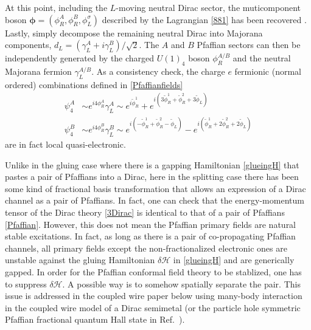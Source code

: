 At this point, including the $L$-moving neutral Dirac sector, the muticomponent boson $\boldsymbol\phi=(\phi^A_R,\phi^B_R,\phi^\sigma_L)$ described by the Lagrangian \eqref{881} has been recovered . Lastly, simply decompose the remaining neutral Dirac into Majorana components, $d_L=(\gamma^A_L+i\gamma^B_L)/\sqrt{2}$. The $A$ and $B$ Pfaffian sectors can then be independently generated by the charged $U(1)_4$ boson $\phi^{A/B}_R$ and the neutral Majorana fermion $\gamma^{A/B}_L$. As a consistency check, the charge $e$ fermionic (normal ordered) combinations defined in \eqref{Pfaffianfields} \begin{align}\psi_4^A&\sim e^{i4\phi^A_R}\gamma_L^A\sim e^{i\tilde\phi^1_R}+e^{i(3\tilde\phi^1_R+\tilde\phi^2_R+3\tilde\phi_L)}\label{psi4def1}\\\psi_4^B&\sim e^{i4\phi^B_R}\gamma_L^B\sim e^{i(-\tilde\phi^1_R+\tilde\phi^2_R-\tilde\phi_L)}-e^{i(\tilde\phi^1_R+2\tilde\phi^2_R+2\tilde\phi_L)}\nonumber\end{align} are in fact local quasi-electronic. %

Unlike in the gluing case where there is a gapping Hamiltonian \eqref{glueingH} that pastes a pair of Pfaffians into a Dirac, here in the splitting case there has been some kind of fractional basis transformation that allows an expression of a Dirac channel as a pair of Pfaffians. In fact, one can check that the energy-momentum tensor of the Dirac theory \eqref{3Dirac} is identical to that of a pair of Pfaffians \eqref{Pfaffian}. However, this does not mean the Pfaffian primary fields are natural stable excitations. In fact, as long as there is a pair of co-propagating Pfaffian channels, all primary fields except the non-fractionalized electronic ones are unstable against the gluing Hamiltonian $\delta\mathcal{H}$ in \eqref{glueingH} and are generically gapped. In order for the Pfaffian conformal field theory to be stablized, one has to suppress $\delta\mathcal{H}$. A possible way is to somehow spatially separate the pair. This issue is addressed in the coupled wire paper below using many-body interaction in the coupled wire model of a Dirac semimetal (or the particle hole symmetric Pfaffian fractional quantum Hall state in Ref.~).




